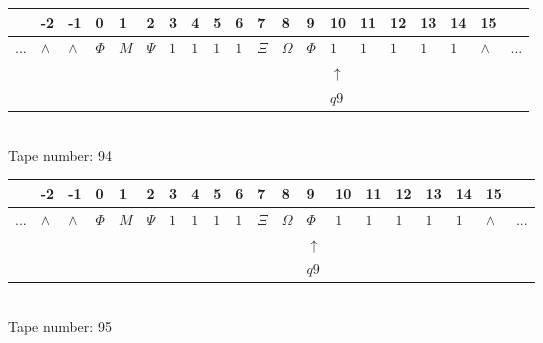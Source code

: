 \documentclass[11pt]{article}
\begin{document}
\begin{table}[H]
\centering
\begin{tabular}{llllllllllllllllllll}
 & -2 & -1 & 0 & 1 & 2 & 3 & 4 & 5 & 6 & 7 & 8 & 9 & 10 & 11 & 12 & 13 & 14 & 15 & \\
\hline
$...$ & \multicolumn{1}{|l|}{$\wedge$} & \multicolumn{1}{|l|}{$\wedge$} & \multicolumn{1}{|l|}{$\Phi$} & \multicolumn{1}{|l|}{$M$} & \multicolumn{1}{|l|}{$\Psi$} & \multicolumn{1}{|l|}{$1$} & \multicolumn{1}{|l|}{$1$} & \multicolumn{1}{|l|}{$1$} & \multicolumn{1}{|l|}{$1$} & \multicolumn{1}{|l|}{$\Xi$} & \multicolumn{1}{|l|}{$\Omega$} & \multicolumn{1}{|l|}{$\Phi$} & \multicolumn{1}{|l|}{$1$} & \multicolumn{1}{|l|}{$1$} & \multicolumn{1}{|l|}{$1$} & \multicolumn{1}{|l|}{$1$} & \multicolumn{1}{|l|}{$1$} & \multicolumn{1}{|l|}{$\wedge$} & $...$\\
\hline
&  &  &  &  &  &  &  &  &  &  &  &  & $\uparrow$ &  &  &  &  &  &  \\
&  &  &  &  &  &  &  &  &  &  &  &  & $ q9 $ &  &  &  &  &  &  \\
\end{tabular}
\\
Tape number: 94
\noindent\makebox[\linewidth]{\hdashrule{\textwidth}{1pt}{1pt}}\end{table}

\begin{table}[H]
\centering
\begin{tabular}{llllllllllllllllllll}
 & -2 & -1 & 0 & 1 & 2 & 3 & 4 & 5 & 6 & 7 & 8 & 9 & 10 & 11 & 12 & 13 & 14 & 15 & \\
\hline
$...$ & \multicolumn{1}{|l|}{$\wedge$} & \multicolumn{1}{|l|}{$\wedge$} & \multicolumn{1}{|l|}{$\Phi$} & \multicolumn{1}{|l|}{$M$} & \multicolumn{1}{|l|}{$\Psi$} & \multicolumn{1}{|l|}{$1$} & \multicolumn{1}{|l|}{$1$} & \multicolumn{1}{|l|}{$1$} & \multicolumn{1}{|l|}{$1$} & \multicolumn{1}{|l|}{$\Xi$} & \multicolumn{1}{|l|}{$\Omega$} & \multicolumn{1}{|l|}{$\Phi$} & \multicolumn{1}{|l|}{$1$} & \multicolumn{1}{|l|}{$1$} & \multicolumn{1}{|l|}{$1$} & \multicolumn{1}{|l|}{$1$} & \multicolumn{1}{|l|}{$1$} & \multicolumn{1}{|l|}{$\wedge$} & $...$\\
\hline
&  &  &  &  &  &  &  &  &  &  &  & $\uparrow$ &  &  &  &  &  &  &  \\
&  &  &  &  &  &  &  &  &  &  &  & $ q9 $ &  &  &  &  &  &  &  \\
\end{tabular}
\\
Tape number: 95
\noindent\makebox[\linewidth]{\hdashrule{\textwidth}{1pt}{1pt}}\end{table}
\clearpage
\end{document}
